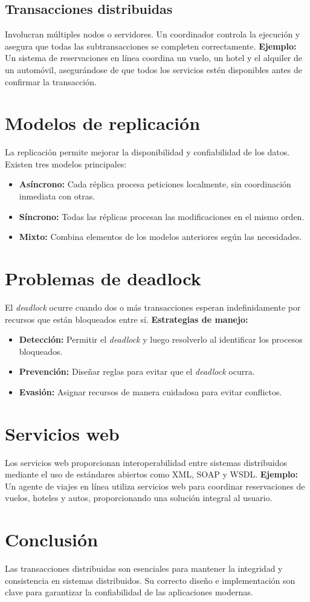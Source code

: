 \documentclass[12pt,a4paper]{article}
\begin{document}
\subsection{Transacciones distribuidas}
Involucran múltiples nodos o servidores. Un coordinador controla la ejecución y asegura que todas las subtransacciones se completen correctamente.  
\textbf{Ejemplo:}  
Un sistema de reservaciones en línea coordina un vuelo, un hotel y el alquiler de un automóvil, asegurándose de que todos los servicios estén disponibles antes de confirmar la transacción.

\section{Modelos de replicación}
La replicación permite mejorar la disponibilidad y confiabilidad de los datos. Existen tres modelos principales:
\begin{itemize}
    \item \textbf{Asíncrono:} Cada réplica procesa peticiones localmente, sin coordinación inmediata con otras.
    \item \textbf{Síncrono:} Todas las réplicas procesan las modificaciones en el mismo orden.
    \item \textbf{Mixto:} Combina elementos de los modelos anteriores según las necesidades.
\end{itemize}

\section{Problemas de deadlock}
El \textit{deadlock} ocurre cuando dos o más transacciones esperan indefinidamente por recursos que están bloqueados entre sí.  
\textbf{Estrategias de manejo:}
\begin{itemize}
    \item \textbf{Detección:} Permitir el \textit{deadlock} y luego resolverlo al identificar los procesos bloqueados.
    \item \textbf{Prevención:} Diseñar reglas para evitar que el \textit{deadlock} ocurra.
    \item \textbf{Evasión:} Asignar recursos de manera cuidadosa para evitar conflictos.
\end{itemize}

\section{Servicios web}
Los servicios web proporcionan interoperabilidad entre sistemas distribuidos mediante el uso de estándares abiertos como XML, SOAP y WSDL.  
\textbf{Ejemplo:}  
Un agente de viajes en línea utiliza servicios web para coordinar reservaciones de vuelos, hoteles y autos, proporcionando una solución integral al usuario.

\section{Conclusión}
Las transacciones distribuidas son esenciales para mantener la integridad y consistencia en sistemas distribuidos. Su correcto diseño e implementación son clave para garantizar la confiabilidad de las aplicaciones modernas.
\end{document}
